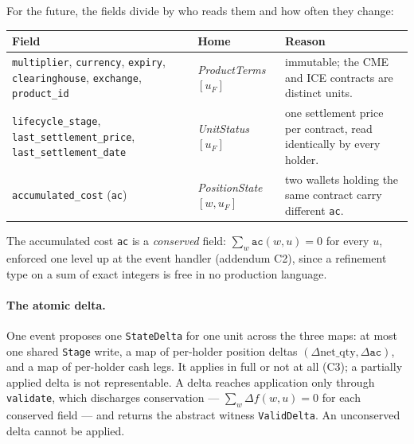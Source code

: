 \documentclass[11pt]{article}
\newcommand{\ac}{\texttt{ac}}
\newcommand{\netq}{\mathrm{net\_qty}}
\newcommand{\code}[1]{\texttt{#1}}
\newcommand{\unit}{u_{F}}
\begin{document}
\noindent For the future, the fields divide by who reads them and how often they change:

\begin{center}\small
\begin{tabular}{@{}p{6.6cm}p{3.0cm}p{5.4cm}@{}}
\toprule
Field & Home & Reason \\
\midrule
\code{multiplier}, \code{currency}, \code{expiry}, \code{clearinghouse}, \code{exchange},
\code{product\_id} & \emph{ProductTerms}$[\unit]$ & immutable; the CME and ICE contracts are
distinct units. \\
\addlinespace
\code{lifecycle\_stage}, \code{last\_settlement\_price}, \code{last\_settlement\_date} &
\emph{UnitStatus}$[\unit]$ & one settlement price per contract, read identically by every holder. \\
\addlinespace
\code{accumulated\_cost} (\ac) & \emph{PositionState}$[w,\unit]$ & two wallets holding the same
contract carry different \ac. \\
\bottomrule
\end{tabular}
\end{center}

\noindent The accumulated cost \ac{} is a \emph{conserved} field: $\sum_w \ac(w,u)=0$ for every $u$,
enforced one level up at the event handler (addendum C2), since a refinement type on a sum of exact
integers is free in no production language.

\paragraph{The atomic delta.} One event proposes one \code{StateDelta} for one unit across the three
maps: at most one shared \code{Stage} write, a map of per-holder position deltas
$(\Delta\netq,\Delta\ac)$, and a map of per-holder cash legs. It applies in full or not at all
(C3); a partially applied delta is not representable. A delta reaches application only through
\code{validate}, which discharges conservation --- $\sum_w\Delta f(w,u)=0$ for each conserved field
--- and returns the abstract witness \code{ValidDelta}. An unconserved delta cannot be applied.
\end{document}

